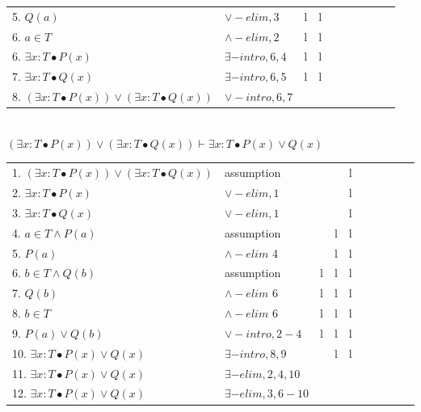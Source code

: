\documentclass{article}
\begin{document}
\begin{enumerate}[\bf I.]
\begin{enumerate}[1.]
\begin{enumerate}[a.]
\begin{tabular}{l ll lll llll}
    5. $Q(a)$                                                        & $\lor-elim, 3$       & l & l \\
    6. $a \in T$                                                     & $\land-elim,2$       & l & l \\
    6. $\exists x:T\bullet P(x)$                                     & $\exists-intro,6,4$  & l & l \\
    7. $\exists x:T\bullet Q(x)$                                     & $\exists-intro,6,5$  & l & l \\
    8. $(\exists x:T \bullet P(x)) \lor (\exists x:T \bullet Q(x))$  & $\lor-intro, 6,7$    &   &   \\
  \end{tabular} \\    
  
  $(\exists x:T \bullet P(x)) \lor (\exists x:T \bullet Q(x))
    \vdash \exists x:T\bullet P(x) \lor Q(x)$ \\
  \begin{tabular}{l ll lll llll}
    1. $(\exists x:T \bullet P(x)) \lor (\exists x:T \bullet Q(x))$  & assumption           &   &   & l \\
    2. $\exists x:T \bullet P(x)$                                    & $\lor-elim, 1$       &   &   & l \\
    3. $\exists x:T \bullet Q(x)$                                    & $\lor-elim, 1$       &   &   & l \\
    4. $a \in T \land P(a)$                                          & assumption           &   & l & l \\
    5. $P(a)$                                                        & $\land-elim$ 4       &   & l & l \\
    6. $b \in T \land Q(b)$                                          & assumption           & l & l & l \\
    7. $Q(b)$                                                        & $\land-elim$ 6       & l & l & l \\    
    8. $b \in T$                                                     & $\land-elim$ 6       & l & l & l \\
    9. $P(a) \lor Q(b)$                                              & $\lor-intro, 2-4$    & l & l & l \\
    10. $\exists x:T\bullet P(x) \lor Q(x)$                          & $\exists-intro,8,9$  &   & l & l \\
    11. $\exists x:T\bullet P(x) \lor Q(x)$                          & $\exists-elim, 2,4,10$  &   &   &   \\
    12. $\exists x:T\bullet P(x) \lor Q(x)$                          & $\exists-elim, 3,6-10$  &   &   &   \\
    

\end{tabular}
\end{enumerate}
\end{enumerate}
\end{enumerate}
\end{document}
